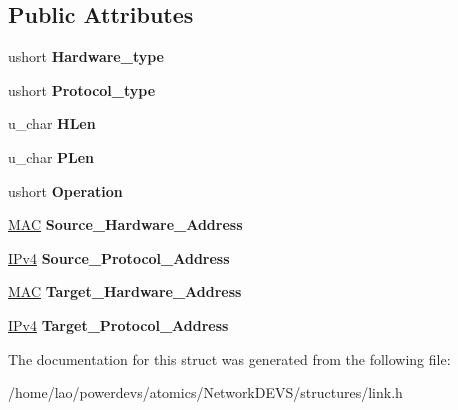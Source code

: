 \subsection*{Public Attributes}
\begin{DoxyCompactItemize}
\item 
ushort {\bfseries Hardware\+\_\+type}\hypertarget{structlink_1_1arp_1_1Packet_a4fb93340388bea40969170a5a2e1f4f4}{}\label{structlink_1_1arp_1_1Packet_a4fb93340388bea40969170a5a2e1f4f4}

\item 
ushort {\bfseries Protocol\+\_\+type}\hypertarget{structlink_1_1arp_1_1Packet_a00e2b61f149f7df6ad5b08d242bea08c}{}\label{structlink_1_1arp_1_1Packet_a00e2b61f149f7df6ad5b08d242bea08c}

\item 
u\+\_\+char {\bfseries H\+Len}\hypertarget{structlink_1_1arp_1_1Packet_a850a1f332321ea6076981be8e2e4d15c}{}\label{structlink_1_1arp_1_1Packet_a850a1f332321ea6076981be8e2e4d15c}

\item 
u\+\_\+char {\bfseries P\+Len}\hypertarget{structlink_1_1arp_1_1Packet_a7488f2b73c81586d55d7fe02ecb69ef9}{}\label{structlink_1_1arp_1_1Packet_a7488f2b73c81586d55d7fe02ecb69ef9}

\item 
ushort {\bfseries Operation}\hypertarget{structlink_1_1arp_1_1Packet_ae6940f788252606c75c3b4f02041861f}{}\label{structlink_1_1arp_1_1Packet_ae6940f788252606c75c3b4f02041861f}

\item 
\hyperlink{structMAC}{M\+AC} {\bfseries Source\+\_\+\+Hardware\+\_\+\+Address}\hypertarget{structlink_1_1arp_1_1Packet_a84fee1bcba8d27362e702b2bd7f16821}{}\label{structlink_1_1arp_1_1Packet_a84fee1bcba8d27362e702b2bd7f16821}

\item 
\hyperlink{structIPv4}{I\+Pv4} {\bfseries Source\+\_\+\+Protocol\+\_\+\+Address}\hypertarget{structlink_1_1arp_1_1Packet_ac75d6824d8c56ecbb76b7e790b67460a}{}\label{structlink_1_1arp_1_1Packet_ac75d6824d8c56ecbb76b7e790b67460a}

\item 
\hyperlink{structMAC}{M\+AC} {\bfseries Target\+\_\+\+Hardware\+\_\+\+Address}\hypertarget{structlink_1_1arp_1_1Packet_a8bec0bf5665f0a96869879264e42b779}{}\label{structlink_1_1arp_1_1Packet_a8bec0bf5665f0a96869879264e42b779}

\item 
\hyperlink{structIPv4}{I\+Pv4} {\bfseries Target\+\_\+\+Protocol\+\_\+\+Address}\hypertarget{structlink_1_1arp_1_1Packet_ab9b74fc0d03a4bb39f44b30bfedf8c40}{}\label{structlink_1_1arp_1_1Packet_ab9b74fc0d03a4bb39f44b30bfedf8c40}

\end{DoxyCompactItemize}


The documentation for this struct was generated from the following file\+:\begin{DoxyCompactItemize}
\item 
/home/lao/powerdevs/atomics/\+Network\+D\+E\+V\+S/structures/link.\+h\end{DoxyCompactItemize}
